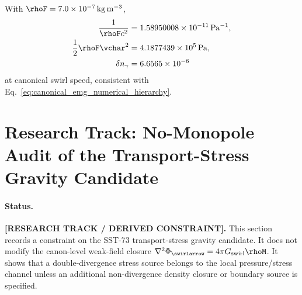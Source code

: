 With \(\rhoF=7.0\times10^{-7}\,\mathrm{kg\,m^{-3}}\),
\begin{align}
    \frac{1}{\rhoF c^2}
    &=
    1.58950008\times10^{-11}\,\mathrm{Pa^{-1}},
    \\
    \frac{1}{2}\rhoF\vchar^2
    &=
    4.1877439\times10^5\,\mathrm{Pa},
    \\
    \delta n_\gamma
    &=
    6.6565\times10^{-6}
\end{align}
at canonical swirl speed, consistent with Eq.~\eqref{eq:canonical_emg_numerical_hierarchy}.


\section{Research Track: No-Monopole Audit of the Transport-Stress Gravity Candidate}
\label{sec:rt_no_monopole_transport_stress_audit}

\paragraph{Status.}
\textbf{[RESEARCH TRACK / DERIVED CONSTRAINT].}
This section records a constraint on the SST-73 transport-stress gravity
candidate.  It does not modify the canon-level weak-field closure
\(\nabla^2\Phi_{\swirlarrow}=4\pi G_{\mathrm{swirl}}\rhoM\).  It shows that a
double-divergence stress source belongs to the local pressure/stress channel
unless an additional non-divergence density closure or boundary source is
specified.

